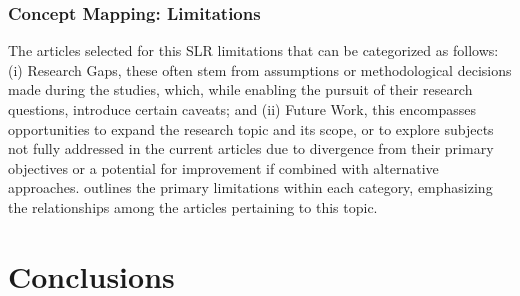 \subsubsection{Concept Mapping: Limitations}

The articles selected for this \acrfull{SLR} limitations that can be categorized as follows: (i) Research Gaps, these often stem from assumptions or methodological decisions made during the studies, which, while enabling the pursuit of their research questions, introduce certain caveats; and (ii) Future Work,  this encompasses opportunities to expand the research topic and its scope, or to explore subjects not fully addressed in the current articles due to divergence from their primary objectives or a potential for improvement if combined with alternative approaches.
%
  outlines the primary limitations within each category, emphasizing the relationships among the articles pertaining to this topic.


%






\section{Conclusions}
\label{sec:Conclusions}





